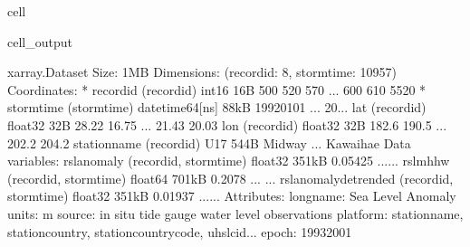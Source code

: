 \documentclass[letterpaper,10pt,english]{jupyterBook}
\begin{document}
\begin{sphinxuseclass}{cell}
\begin{sphinxVerbatimOutput}
\begin{sphinxuseclass}{cell_output}
\begin{sphinxVerbatim}[commandchars=\\\{\}]
\PYGZlt{}xarray.Dataset\PYGZgt{} Size: 1MB
Dimensions:                (record\PYGZus{}id: 8, storm\PYGZus{}time: 10957)
Coordinates:
  * record\PYGZus{}id              (record\PYGZus{}id) int16 16B 500 520 570 ... 600 610 5520
  * storm\PYGZus{}time             (storm\PYGZus{}time) datetime64[ns] 88kB 1992\PYGZhy{}01\PYGZhy{}01 ... 20...
    lat                    (record\PYGZus{}id) float32 32B 28.22 16.75 ... 21.43 20.03
    lon                    (record\PYGZus{}id) float32 32B 182.6 190.5 ... 202.2 204.2
    station\PYGZus{}name           (record\PYGZus{}id) \PYGZlt{}U17 544B \PYGZsq{}Midway\PYGZsq{} ... \PYGZsq{}Kawaihae\PYGZsq{}
Data variables:
    rsl\PYGZus{}anomaly            (record\PYGZus{}id, storm\PYGZus{}time) float32 351kB \PYGZhy{}0.05425 ......
    rsl\PYGZus{}mhhw               (record\PYGZus{}id, storm\PYGZus{}time) float64 701kB \PYGZhy{}0.2078 ... ...
    rsl\PYGZus{}anomaly\PYGZus{}detrended  (record\PYGZus{}id, storm\PYGZus{}time) float32 351kB \PYGZhy{}0.01937 ......
Attributes:
    long\PYGZus{}name:  Sea Level Anomaly
    units:      m
    source:     in situ tide gauge water level observations
    platform:   station\PYGZus{}name, station\PYGZus{}country, station\PYGZus{}country\PYGZus{}code, uhslc\PYGZus{}id...
    epoch:      1993\PYGZhy{}2001
\end{sphinxVerbatim}

\end{sphinxuseclass}\end{sphinxVerbatimOutput}

\end{sphinxuseclass}
\end{document}
